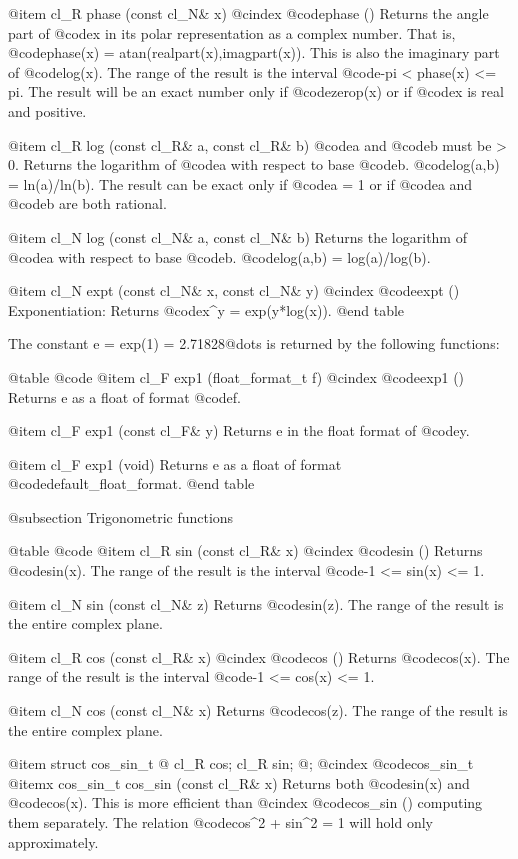 @item cl_R phase (const cl_N& x)
@cindex @code{phase ()}
Returns the angle part of @code{x} in its polar representation as a
complex number. That is, @code{phase(x) = atan(realpart(x),imagpart(x))}.
This is also the imaginary part of @code{log(x)}.
The range of the result is the interval @code{-pi < phase(x) <= pi}.
The result will be an exact number only if @code{zerop(x)} or
if @code{x} is real and positive.

@item cl_R log (const cl_R& a, const cl_R& b)
@code{a} and @code{b} must be > 0. Returns the logarithm of @code{a} with
respect to base @code{b}. @code{log(a,b) = ln(a)/ln(b)}.
The result can be exact only if @code{a = 1} or if @code{a} and @code{b}
are both rational.

@item cl_N log (const cl_N& a, const cl_N& b)
Returns the logarithm of @code{a} with respect to base @code{b}.
@code{log(a,b) = log(a)/log(b)}.

@item cl_N expt (const cl_N& x, const cl_N& y)
@cindex @code{expt ()}
Exponentiation: Returns @code{x^y = exp(y*log(x))}.
@end table

The constant e = exp(1) = 2.71828@dots{} is returned by the following functions:

@table @code
@item cl_F exp1 (float_format_t f)
@cindex @code{exp1 ()}
Returns e as a float of format @code{f}.

@item cl_F exp1 (const cl_F& y)
Returns e in the float format of @code{y}.

@item cl_F exp1 (void)
Returns e as a float of format @code{default_float_format}.
@end table


@subsection Trigonometric functions

@table @code
@item cl_R sin (const cl_R& x)
@cindex @code{sin ()}
Returns @code{sin(x)}. The range of the result is the interval
@code{-1 <= sin(x) <= 1}.

@item cl_N sin (const cl_N& z)
Returns @code{sin(z)}. The range of the result is the entire complex plane.

@item cl_R cos (const cl_R& x)
@cindex @code{cos ()}
Returns @code{cos(x)}. The range of the result is the interval
@code{-1 <= cos(x) <= 1}.

@item cl_N cos (const cl_N& x)
Returns @code{cos(z)}. The range of the result is the entire complex plane.

@item struct cos_sin_t @{ cl_R cos; cl_R sin; @};
@cindex @code{cos_sin_t}
@itemx cos_sin_t cos_sin (const cl_R& x)
Returns both @code{sin(x)} and @code{cos(x)}. This is more efficient than
@cindex @code{cos_sin ()}
computing them separately. The relation @code{cos^2 + sin^2 = 1} will
hold only approximately.

